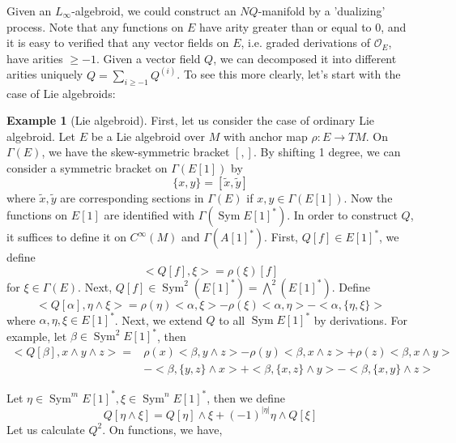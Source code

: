 \documentclass[12pt]{amsart}
\theoremstyle{definition}
\newtheorem{example}[thm]{Example}
\theoremstyle{remark}
\numberwithin{equation}{section}
\newcommand{\CO}{{\mathcal O}}
\newcommand{\1}{{\mathbb{1}}}
\newcommand{\sym}{\operatorname{Sym}}
\begin{document}
Given an $L_{\infty}$-algebroid, we could construct an $NQ$-manifold by a 'dualizing' process. Note that any functions on $E$ have arity greater than or equal to 0, and it is easy to verified that any vector fields on $E$, i.e. graded derivations of $\CO_E$, have arities $\ge -1$. Given a vector field $Q$, we can decomposed it into different arities uniquely $Q=\sum_{i\ge -1} Q^{(i)}$. To see this more clearly, let's start with the case of Lie algebroids:
\begin{example}[Lie algebroid]
	First, let us consider the case of ordinary Lie algebroid. Let $E$ be a Lie algebroid over $M$ with anchor map $\rho: E \to TM$. On $\Gamma(E)$, we have the skew-symmetric bracket $[,]$. By shifting 1 degree, we can consider a symmetric bracket on $\Gamma(E[1])$ by
	\begin{equation*}
	\{x,y\}=[\tilde{x},\tilde{y}]
	\end{equation*}
	where $\tilde{x}, \tilde{y}$ are corresponding sections in $\Gamma(E)$ if $x,y \in \Gamma(E[1])$. 
	Now the functions on $E[1]$ are identified with $\Gamma(\sym E[1]^* )$. In order to construct $Q$, it suffices to define it on $C^{\infty}(M)$ and $\Gamma (A[1]^*)$.
	First, $Q[f] \in E[1]^*$, we define
	\begin{equation*}
	<Q[f],\xi>=\rho(\xi) [f]
	\end{equation*}
	for $\xi \in \Gamma(E)$. Next, $Q[f] \in \sym^2 (E[1]^*)=\bigwedge^2 (E[1]^*)$. Define
	\begin{equation*}
	<Q[\alpha], \eta\wedge \xi>= \rho(\eta)<\alpha, \xi>- \rho(\xi)<\alpha, \eta>-<\alpha, \{ \eta, \xi\}>
	\end{equation*}
	where $\alpha, \eta, \xi \in E[1]^*$. Next, we extend $Q$ to all $\sym E[1]^*$ by derivations.  For example, let $\beta \in \sym^2 E[1]^*$, then
	\begin{align*}
	<Q[\beta], x\wedge y\wedge z> =&\rho(x) <\beta, y\wedge z>-\rho(y)<\beta, x\wedge z>+\rho(z)<\beta, x\wedge y>\\
	&- <\beta,\{y,z \}\wedge x>+< \beta, \{x,z\}\wedge y>- <\beta, \{x,y\}\wedge z>
	\end{align*}
	
	
	
	
	Let $\eta \in \sym^m E[1]^*, \xi \in \sym^n E[1]^*$, then we define 
	\begin{equation*}
	Q[\eta \wedge \xi]=Q[\eta]\wedge \xi + (-1)^{|\eta|} \eta \wedge Q[\xi]
	\end{equation*} 
	Let us calculate $Q^2$. On functions, we have, 
	

\end{example}
\end{document}
